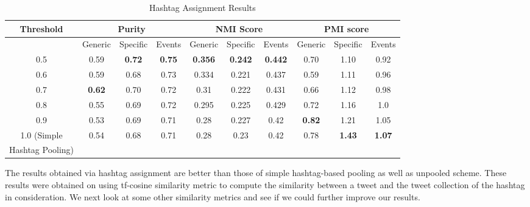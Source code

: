 \documentclass[10pt,a5paper,twoside]{article}
\begin{document}
\begin{table}[!h]
\centering
\resizebox{14cm}{!} 
{
	\begin{tabular}{|c|ccc|ccc|ccc|}
	\hline
	\footnotesize{Threshold}  & \multicolumn {3}{c}{Purity} & \multicolumn {3}{c}{NMI Score} & \multicolumn {3}{c|}{PMI score}\\
	\hline
	 & Generic & Specific & Events &  Generic & Specific & Events &  Generic & Specific & Events\\
	\hline
	0.5 & 0.59 & \textbf{0.72} & \textbf{0.75} & \textbf{0.356} & \textbf{0.242} & \textbf{0.442} & 0.70 & 1.10 & 0.92 \\
	\hline
	0.6 & 0.59 & 0.68 & 0.73 & 0.334 & 0.221 & 0.437 & 0.59 & 1.11 & 0.96 \\
	\hline
	0.7 & \textbf{0.62} & 0.70 & 0.72 & 0.31 & 0.222 & 0.431 & 0.66 & 1.12 & 0.98 \\
	\hline
	0.8 & 0.55 & 0.69 & 0.72 & 0.295 & 0.225 & 0.429 & 0.72 & 1.16 & 1.0 \\
	\hline
	0.9 & 0.53 & 0.69 & 0.71 & 0.28 & 0.227 & 0.42 & \textbf{0.82} & 1.21 & 1.05 \\
	\hline
	1.0 (\small Simple & 0.54 & 0.68 & 0.71 & 0.28 & 0.23 & 0.42 & 0.78 & \textbf{1.43} & \textbf{1.07} \\
	\small Hashtag Pooling) & & & & & & & & & \\
	\hline
	\end{tabular}
}
\caption{Hashtag Assignment Results}\label{tbl-9}
\end{table}

The results obtained via hashtag assignment are better than those of simple hashtag-based pooling as well as unpooled scheme. These results were obtained on using tf-cosine similarity metric to compute the similarity between a tweet and the tweet collection of the hashtag in consideration. We next look at some other similarity metrics and see if we could further improve our results.
\end{document}

